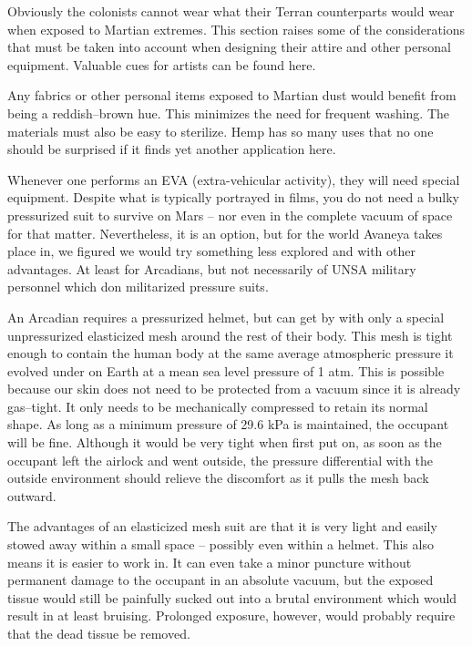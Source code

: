

Obviously the colonists cannot wear what their Terran counterparts would wear when exposed to Martian extremes. This section raises some of the considerations that must be taken into account when designing their attire and other personal equipment. Valuable cues for artists can be found here.

Any fabrics or other personal items exposed to Martian dust would benefit from being a reddish--brown hue. This minimizes the need for frequent washing. The materials must also be easy to sterilize. Hemp has so many uses that no one should be surprised if it finds yet another application here.

Whenever one performs an EVA (extra-vehicular activity), they will need special equipment. Despite what is typically portrayed in films, you do not need a bulky pressurized suit to survive on Mars -- nor even in the complete vacuum of space for that matter. Nevertheless, it is an option, but for the world Avaneya takes place in, we figured we would try something less explored and with other advantages. At least for Arcadians, but not necessarily of UNSA military personnel which don militarized pressure suits.

An Arcadian requires a pressurized helmet, but can get by with only a special unpressurized elasticized mesh around the rest of their body. This mesh is tight enough to contain the human body at the same average atmospheric pressure it evolved under on Earth at a mean sea level pressure of 1 atm. This is possible because our skin does not need to be protected from a vacuum since it is already gas--tight. It only needs to be mechanically compressed to retain its normal shape. As long as a minimum pressure of 29.6 kPa is maintained, the occupant will be fine. Although it would be very tight when first put on, as soon as the occupant left the airlock and went outside, the pressure differential with the outside environment should relieve the discomfort as it pulls the mesh back outward.

The advantages of an elasticized mesh suit are that it is very light and easily stowed away within a small space -- possibly even within a helmet. This also means it is easier to work in. It can even take a minor puncture without permanent damage to the occupant in an absolute vacuum, but the exposed tissue would still be painfully sucked out into a brutal environment which would result in at least bruising. Prolonged exposure, however, would probably require that the dead tissue be removed.

